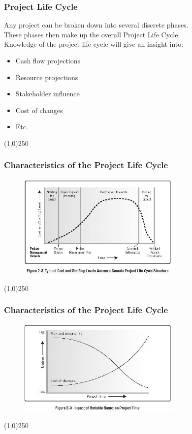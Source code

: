 \begin{frame}
\frametitle{Project Life Cycle}
Any project can be broken down into several discrete phases.\\
These phases then make up the overall Project Life Cycle.\\
Knowledge of the project life cycle will give an insight into:\\
\begin{itemize}
	\item Cash flow projections
	\item Resource projections
	\item Stakeholder influence
	\item Cost of changes
	\item Etc.
\end{itemize}
\end{frame}
\begin{center}\line(1,0){250}\end{center}



\begin{frame}
\frametitle{Characteristics of the Project Life Cycle}
 \begin{figure}
 	\centering
 		\includegraphics[width = 8cm]{images/Fig2-8.jpg}
 	\label{fig:2-8}
 \end{figure}
\end{frame}
\begin{center}\line(1,0){250}\end{center}



\begin{frame}
\frametitle{Characteristics of the Project Life Cycle}
 \begin{figure}
 	\centering
 		\includegraphics[width = 8cm]{images/Fig2-9.jpg}
 	\label{fig:2-9}
 \end{figure}
\end{frame}
\begin{center}\line(1,0){250}\end{center}



